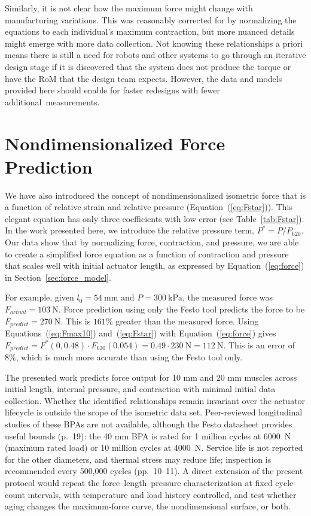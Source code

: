 Similarly, it is not clear how the maximum force might change with manufacturing variations. This was reasonably corrected for by normalizing the equations to each individual's maximum contraction, but more nuanced details might emerge with more data collection. Not knowing these relationships a priori means there is still a need for robots and other systems to go through an iterative design stage if it is discovered that the system does not produce the torque or have the RoM that the design team expects. However, the data and models provided here should enable for faster redesigns with fewer \mbox{additional measurements.}


\section{Nondimensionalized Force Prediction}

We have also introduced the concept of nondimensionalized isometric force that is a function of relative strain and relative pressure (Equation~(\ref{eq:Fstar})). This elegant equation has only three coefficients with low error (see Table~\ref{tab:Fstar}). In the work presented here, we introduce the relative pressure term, $P^*=P/P_{620}$. Our data show that by normalizing force, contraction, and pressure, we are able to create a simplified force equation as a function of contraction and pressure that scales well with initial actuator length, as expressed by Equation~(\ref{eq:force}) in Section~\ref{sec:force_model}.

For example, given $l_0=\qty{54}{\mm}$ and $P=\qty{300}{\kPa}$, the measured force was \mbox{$F_{actual} = \qty{103}{\N}$.} Force prediction using only the Festo tool predicts the force to be \mbox{$F_{predict} = \qty{270}{\N}$.} This is $161\%$ greater than the measured force. Using Equations~(\ref{eq:Fmax10}) and~(\ref{eq:Fstar}) with Equation~(\ref{eq:force}) gives $F_{predict} = F^*(0, 0.48) \cdot F_{620}(0.054) = 0.49 \cdot \qty{230}{\N} = \qty{112}{\N}$. This is an error of $8\%$, which is much more accurate than using the Festo tool only.

The presented work predicts force output for 10 mm and 20 mm muscles across initial length, internal pressure, and contraction with minimal initial data collection. Whether the identified relationships remain invariant over the actuator lifecycle is outside the scope of the isometric data set. Peer-reviewed longitudinal studies of these BPAs are not available, although the Festo datasheet provides useful bounds \citep{festo_2026} (p.~19): the 40 mm BPA is rated for 1 million cycles at \qty{6000}{\N} (maximum rated load) or 10 million cycles at \qty{4000}{\N}. Service life is not reported for the other diameters, and thermal stress may reduce life; inspection is recommended every 500,000 cycles \citep{festo_2018} (pp.~10--11). A direct extension of the present protocol would repeat the force--length--pressure characterization at fixed cycle-count intervals, with temperature and load history controlled, and test whether aging changes the maximum-force curve, the nondimensional surface, or both.

